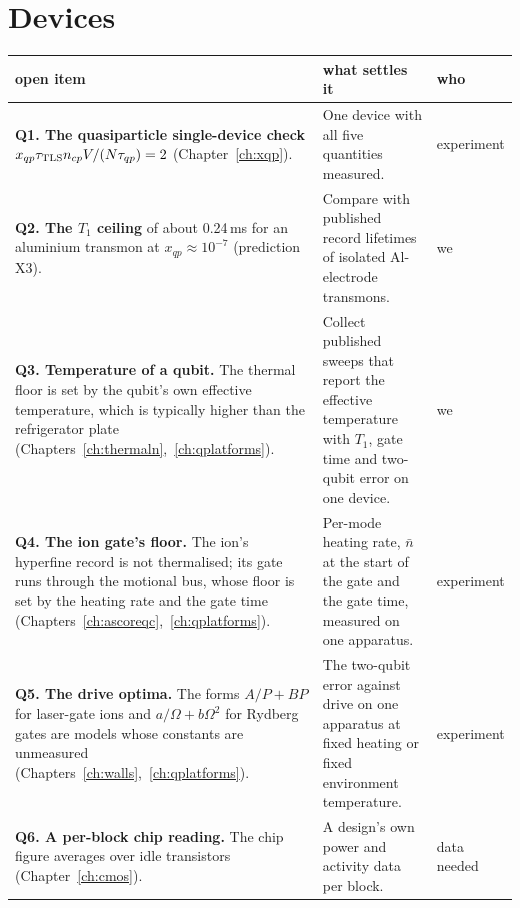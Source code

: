 \section{Devices}
{\small\begin{longtable}{@{}>{\raggedright\arraybackslash}p{}>{\raggedright\arraybackslash}p{}>{\raggedright\arraybackslash}p{}@{}}
\toprule
open item & what settles it & who \\\midrule\endhead
\textbf{Q1. The quasiparticle single-device check} $x_{qp}\tau_{\rm TLS}n_{cp}V/(N\tau_{qp})=2$ (Chapter~\ref{ch:xqp}). & One device with all five quantities
 measured. & experiment \\
\textbf{Q2. The $T_1$ ceiling} of about 0.24\,ms for an aluminium transmon at $x_{qp}\approx10^{-7}$ (prediction X3). & Compare with published
 record lifetimes of isolated Al-electrode transmons. & we \\
\textbf{Q3. Temperature of a qubit.} The thermal floor is set by the qubit's own effective temperature, which is typically higher than the
 refrigerator plate (Chapters~\ref{ch:thermaln},~\ref{ch:qplatforms}). & Collect published sweeps that report the effective temperature with $T_1$,
 gate time and two-qubit error on one device. & we \\
\textbf{Q4. The ion gate's floor.} The ion's hyperfine record is not thermalised; its gate runs through the motional bus, whose floor is set by
 the heating rate and the gate time (Chapters~\ref{ch:ascoreqc},~\ref{ch:qplatforms}). & Per-mode heating rate, $\bar n$ at the start of the gate
 and the gate time, measured on one apparatus. & experiment \\
\textbf{Q5. The drive optima.} The forms $A/P+BP$ for laser-gate ions and $a/\Omega+b\Omega^2$ for Rydberg gates are models whose
 constants are unmeasured (Chapters~\ref{ch:walls},~\ref{ch:qplatforms}). & The two-qubit error against drive on one apparatus at fixed heating
 or fixed environment temperature. & experiment \\
\textbf{Q6. A per-block chip reading.} The chip figure averages over idle transistors (Chapter~\ref{ch:cmos}). & A design's own power and
 activity data per block. & data needed \\
\bottomrule
\end{longtable}}

